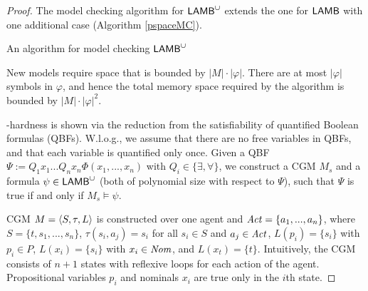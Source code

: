 \begin{proof}
The model checking algorithm for  $\mathsf{LAMB}^\cup$ extends the one for $\mathsf{LAMB}$ with one additional case (Algorithm \ref{pspaceMC}).

\begin{breakablealgorithm}
	\caption{An algorithm for model checking $\mathsf{LAMB}^\cup$}\label{pspaceMC} 
 \footnotesize
	\begin{algorithmic}[1] 		

    
\Case {$\varphi = [\pi \cup \rho] \psi $ }
		\EndCase
   \EndProcedure

	\end{algorithmic}
\end{breakablealgorithm}


New models require space that is bounded by $|M|\cdot|\varphi|$.
There are at most $|\varphi|$ symbols in $\varphi$, and hence the total memory space required by the algorithm is bounded by $|M| \cdot |\varphi|^2$.




\Pspace-hardness is shown via the reduction from the satisfiability of quantified Boolean formulas (QBFs). W.l.o.g., we assume that there are no free variables in QBFs, and that each variable is quantified only once. Given a QBF $\Psi := Q_1 x_1 ... Q_n x_n \Phi (x_1, ..., x_n)$ with $Q_i \in \{\exists, \forall\}$, we construct a CGM $M_s$ and a formula $\psi \in \mathsf{LAMB}^\cup$ (both of polynomial size with respect to $\Psi$), such that $\Psi$ is true if and only if $M_s \models \psi$.

CGM $M = \langle S, \tau, L\rangle$ is constructed over one agent and $\mathit{Act} = \{a_1, ..., a_n\}$, where $S = \{t, s_1, ..., s_{n}\}$, $\tau(s_i, a_j) = s_i$ for all $s_i \in S$ and $a_j \in \mathit{Act}$, $L(p_i) = \{s_i\}$ with $p_i \in P$, $L(x_i) = \{s_i\}$ with $x_i \in \mathit{Nom}$, and $L(x_t) = \{t\}$. Intuitively, the CGM consists of $n+1$ states with reflexive loops for each action of the agent. Propositional variables $p_i$ and nominals $x_i$ are true only in the $i$th state. 


\end{proof}
